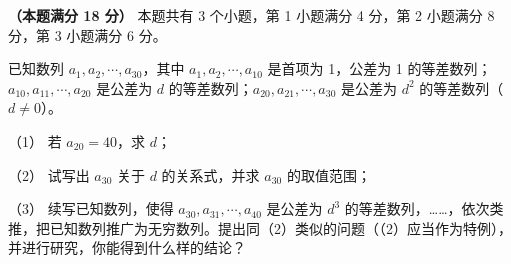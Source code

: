 \begin{question}
\textbf{（本题满分 18 分）} 本题共有 3 个小题，第 1 小题满分 4 分，第 2 小题满分 8 分，第 3 小题满分 6 分。

已知数列 $a_1,a_2,\cdots,a_{30}$，其中 $a_1,a_2,\cdots,a_{10}$ 是首项为 1，公差为 1 的等差数列；$a_{10},a_{11},\cdots,a_{20}$ 是公差为 $d$ 的等差数列；$a_{20},a_{21},\cdots,a_{30}$ 是公差为 $d^2$ 的等差数列（$d\neq0$）。

（1） 若 $a_{20}=40$，求 $d$；

（2） 试写出 $a_{30}$ 关于 $d$ 的关系式，并求 $a_{30}$ 的取值范围；

（3） 续写已知数列，使得 $a_{30},a_{31},\cdots,a_{40}$ 是公差为 $d^3$ 的等差数列，……，依次类推，把已知数列推广为无穷数列。提出同（2）类似的问题（（2）应当作为特例），并进行研究，你能得到什么样的结论？

\end{question}